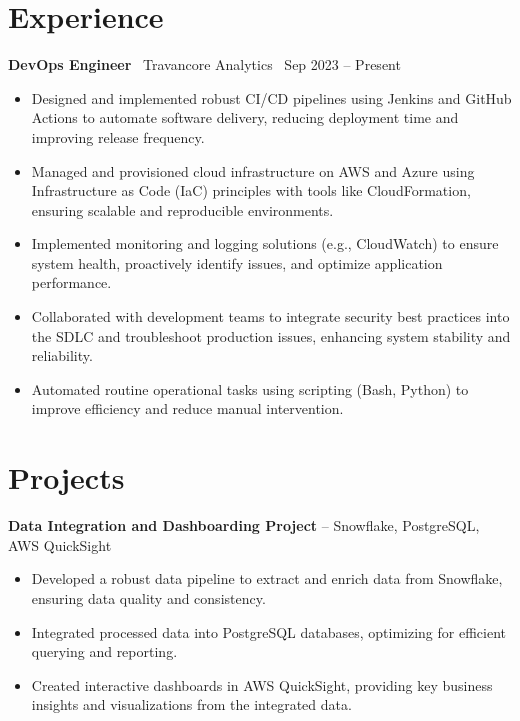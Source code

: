 \documentclass[a4paper,10pt]{article}
\begin{document}
\section*{Experience}
\textbf{DevOps Engineer} \
Travancore Analytics \ \hfill Sep 2023 – Present
\begin{itemize}[leftmargin=0.5in, label=\textbullet]
    \item Designed and implemented robust CI/CD pipelines using Jenkins and GitHub Actions to automate software delivery, reducing deployment time and improving release frequency.
    \item Managed and provisioned cloud infrastructure on AWS and Azure using Infrastructure as Code (IaC) principles with tools like CloudFormation, ensuring scalable and reproducible environments.
    \item Implemented monitoring and logging solutions (e.g., CloudWatch) to ensure system health, proactively identify issues, and optimize application performance.
    \item Collaborated with development teams to integrate security best practices into the SDLC and troubleshoot production issues, enhancing system stability and reliability.
    \item Automated routine operational tasks using scripting (Bash, Python) to improve efficiency and reduce manual intervention.
\end{itemize}


\section*{Projects}
	\textbf{Data Integration and Dashboarding Project} – Snowflake, PostgreSQL, AWS QuickSight
\begin{itemize}[leftmargin=0.25in, label=\textbullet]
    \item Developed a robust data pipeline to extract and enrich data from Snowflake, ensuring data quality and consistency.
    \item Integrated processed data into PostgreSQL databases, optimizing for efficient querying and reporting.
    \item Created interactive dashboards in AWS QuickSight, providing key business insights and visualizations from the integrated data.
\end{itemize}
\end{document}
